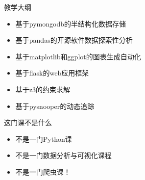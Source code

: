 \documentclass{beamer}
\begin{document}
\begin{frame}[t]{教学大纲}
    \begin{block}{}
        \begin{itemize}
            \item 基于pymongodb的半结构化数据存储
            \item 基于pandas的开源软件数据探索性分析
            \item 基于matplotlib和ggplot的图表生成自动化
            \item 基于flask的web应用框架
            \item 基于z3的约束求解
            \item 基于pysnooper的动态追踪
        \end{itemize}
    \end{block}
\end{frame}

\begin{frame}[t]{这门课不是什么}
    \begin{block}{}
        \begin{itemize}
            \item 不是一门Python课
            \pause
            \item 不是一门数据分析与可视化课程
            \pause
            \item 不是一门爬虫课！
        \end{itemize}
    \end{block}
\end{frame}
\end{document}
